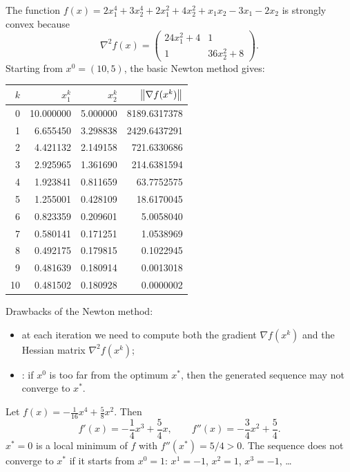 \begin{example}
    The function $f(x) = 2x_1^4 + 3x_2^4 + 2x_1^2 + 4x_2^2 + x_1x_2 - 3x_1 - 2x_2$ is strongly convex because
    \[
        \nabla^2 f(x) = \begin{pmatrix} 24x_1^2 + 4 & 1\\ 1 & 36x_2^2 + 8 \end{pmatrix}.
    \]
    Starting from $x^0 = (10, 5)$, the basic Newton method gives:
    \begin{center}
    \begin{tabular}{rrrr}
        \toprule
        $k$ & $x_1^k$ & $x_2^k$ & $\left\lVert \nabla f(x^k) \right\rVert$\\
        \midrule
        0 & 10.000000 & 5.000000 & 8189.6317378\\
        1 & 6.655450 & 3.298838 & 2429.6437291\\
        2 & 4.421132 & 2.149158 & 721.6330686\\
        3 & 2.925965 & 1.361690 & 214.6381594\\
        4 & 1.923841 & 0.811659 & 63.7752575\\
        5 & 1.255001 & 0.428109 & 18.6170045\\
        6 & 0.823359 & 0.209601 & 5.0058040\\
        7 & 0.580141 & 0.171251 & 1.0538969\\
        8 & 0.492175 & 0.179815 & 0.1022945\\
        9 & 0.481639 & 0.180914 & 0.0013018\\
        10 & 0.481502 & 0.180928 & 0.0000002\\
        \bottomrule
    \end{tabular}
    \end{center}
\end{example}

Drawbacks of the Newton method:
\begin{itemize}
    \item at each iteration we need to compute both the gradient $\nabla f(x^k)$ and the Hessian matrix $\nabla^2 f(x^k)$;
    \item {}: if $x^0$ is too far from the optimum $x^*$, then the generated sequence may not converge to $x^*$.
\end{itemize}

\begin{example}
    Let $f(x) = -\frac{1}{16}x^4 + \frac{5}{8}x^2$. Then
    \[
        f'(x) = -\frac{1}{4}x^3 + \frac{5}{4}x, \qquad f''(x) = -\frac{3}{4}x^2 + \frac{5}{4}.
    \]
    $x^* = 0$ is a local minimum of $f$ with $f''(x^*) = 5/4 > 0$. The sequence does not converge to $x^*$ if it starts from $x^0 = 1$: $x^1 = -1$, $x^2 = 1$, $x^3 = -1$, \dots
\end{example}

